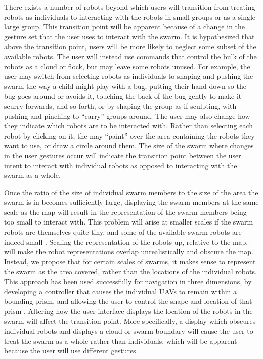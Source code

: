 \documentclass[]{article}
\begin{document}
There exists a number of robots beyond which users will transition from treating robots as individuals to interacting with the robots in small groups or as a single large group. 
This transition point will be apparent because of a change in the gesture set that the user uses to interact with the swarm. 
It is hypothesized that above the transition point, users will be more likely to neglect some subset of the available robots. 
The user will instead use commands that control the bulk of the robots as a cloud or flock, but may leave some robots unused. 
For example, the user may switch from selecting robots as individuals to shaping and pushing the swarm the way a child might play with a bug, putting their hand down so the bug goes around or avoids it, touching the back of the bug gently to make it scurry forwards, and so forth, or by shaping the group as if sculpting, with pushing and pinching to ``carry'' groups around. 
The user may also change how they indicate which robots are to be interacted with. 
Rather than selecting each robot by clicking on it, the may ``paint'' over the area containing the robots they want to use, or draw a circle around them. 
The size of the swarm where changes in the user gestures occur will indicate the transition point between the user intent to interact with individual robots as opposed to interacting with the swarm as a whole. 

Once the ratio of the size of individual swarm members to the size of the area the swarm is in becomes sufficiently large, displaying the swarm members at the same scale as the map will result in the representation of the swarm members being too small to interact with. 
This problem will arise at smaller scales if the swarm robots are themselves quite tiny, and some of the available swarm robots are indeed small \cite{pelrine2012diamagnetically}.
Scaling the representation of the robots up, relative to the map, will make the robot representations overlap unrealistically and obscure the map. 
Instead, we propose that for certain scales of swarms, it makes sense to represent the swarm as the area covered, rather than the locations of the individual robots.
This approach has been used successfully for navigation in three dimensions, by developing a controller that causes the individual UAVs to remain within a bounding prism, and allowing the user to control the shape and location of that prism \cite{ayanian2014controlling}.
Altering how the user interface displays the location of the robots in the swarm will affect the transition point. 
More specifically, a display which obscures individual robots and displays a cloud or swarm boundary will cause the user to treat the swarm as a whole rather than individuals, which will be apparent because the user will use different gestures. 
\end{document}
